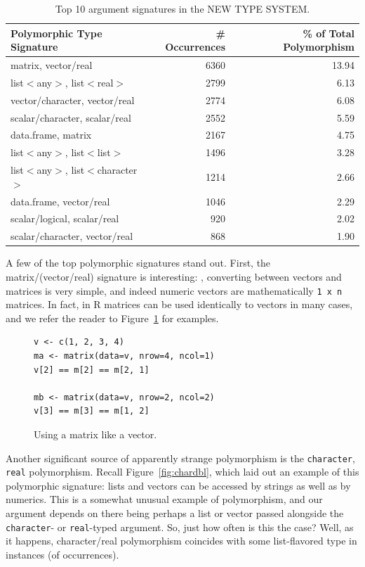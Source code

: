 \documentclass[acmsmall,10pt,review,anonymous]{acmart}\settopmatter{printfolios=true,printccs=false,printacmref=false}
\begin{document}
\begin{table}[ht]
\label{tab:toppolyWHATTS}
\centering
\begin{tabular}{lrr}
  \hline
Polymorphic Type Signature & \# Occurrences & \% of Total Polymorphism \\ 
  \hline
  matrix, vector/real & 6360 & 13.94 \\ 
  list$<$any$>$, list$<$real$>$ & 2799 & 6.13 \\ 
  vector/character, vector/real & 2774 & 6.08 \\ 
  scalar/character, scalar/real & 2552 & 5.59 \\ 
  data.frame, matrix & 2167 & 4.75 \\ 
  list$<$any$>$, list$<$list$>$ & 1496 & 3.28 \\ 
  list$<$any$>$, list$<$character$>$ & 1214 & 2.66 \\ 
  data.frame, vector/real & 1046 & 2.29 \\ 
  scalar/logical, scalar/real & 920 & 2.02 \\ 
  scalar/character, vector/real & 868 & 1.90 \\
   \hline
\end{tabular}
\caption{Top 10 argument signatures in the NEW TYPE SYSTEM.}
\end{table}

A few of the top polymorphic signatures stand out.
First, the matrix/(vector/real) signature is interesting: , converting between vectors and matrices is very simple, and indeed numeric vectors are mathematically {\tt 1 x n} matrices.
In fact, in R matrices can be used identically to vectors in many cases, and we refer the reader to Figure~\ref{fig:matasvec} for examples.
\begin{figure}[!hb]{\small\begin{lstlisting}[style=R]
v <- c(1, 2, 3, 4)
ma <- matrix(data=v, nrow=4, ncol=1)
v[2] == m[2] == m[2, 1]

mb <- matrix(data=v, nrow=2, ncol=2)
v[3] == m[3] == m[1, 2] 
\end{lstlisting}}\caption{Using a matrix like a vector.}\label{fig:matasvec}\end{figure}


Another significant source of apparently strange polymorphism is the {\tt character}, {\tt real} polymorphism.
Recall Figure~\ref{fig:chardbl}, which laid out an example of this polymorphic signature: lists and vectors can be accessed by strings as well as by numerics.
This is a somewhat unusual example of polymorphism, and our argument depends on there being perhaps a list or vector passed alongside the {\tt character}- or {\tt real}-typed argument.
So, just how often is this the case?
Well, as it happens, character/real polymorphism coincides with some list-flavored type in \INDEXCOINCIDENCE instances (\INDEXYPERC of occurrences).
\end{document}
